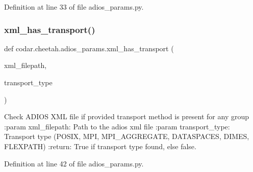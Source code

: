 Definition at line 33 of file adios\+\_\+params.\+py.

\mbox{\label{namespacecodar_1_1cheetah_1_1adios__params_a9dff010d44b62d23336c76d11ed2c7e3}} 
\subsubsection{\texorpdfstring{xml\+\_\+has\+\_\+transport()}{xml\_has\_transport()}}
{\footnotesize\ttfamily def codar.\+cheetah.\+adios\+\_\+params.\+xml\+\_\+has\+\_\+transport (\begin{DoxyParamCaption}\item[{}]{xml\+\_\+filepath,  }\item[{}]{transport\+\_\+type }\end{DoxyParamCaption})}

\begin{DoxyVerb}Check ADIOS XML file if provided transport method is present for any group
:param xml_filepath: Path to the adios xml file
:param transport_type: Transport type (POSIX, MPI, MPI_AGGREGATE,
DATASPACES, DIMES, FLEXPATH)
:return: True if transport type found, else false.
\end{DoxyVerb}
 

Definition at line 42 of file adios\+\_\+params.\+py.

